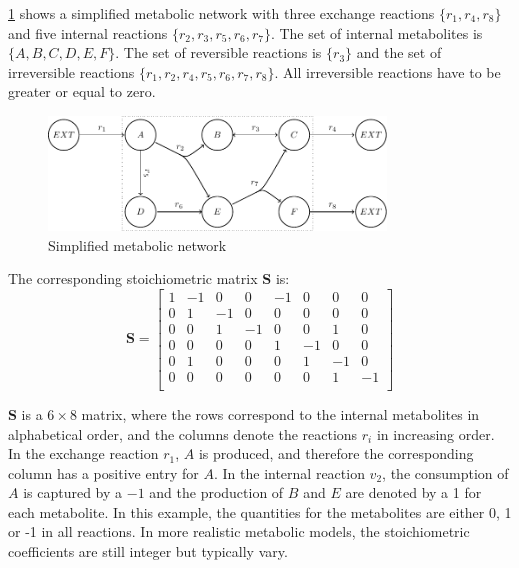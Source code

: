 \cref{fig:simple_model} shows a simplified metabolic network with three exchange reactions $\{r_1, r_4, r_8\}$ and five internal reactions $\{r_2, r_3, r_5, r_6, r_7\}$. The set of internal metabolites is $\{A, B, C, D, E, F\}$. The set of reversible reactions is $\{r_3\}$ and the set of irreversible reactions $\{r_1, r_2, r_4, r_5, r_6, r_7, r_8\}$. All irreversible reactions have to be greater or equal to zero. %

\begin{figure}[h!]
    \centering
    \includegraphics[width=0.8\textwidth]{Images/tikz_graphs_model_with_hyperarcs.pdf}
    \caption{Simplified metabolic network}
    \label{fig:simple_model}
\end{figure}

The corresponding stoichiometric matrix $\mathbf S$ is:
\begin{equation*}
    \mathbf S =
    \left[\begin{array}{cccccccc}
        1 & -1 & 0 & 0 & -1 & 0 & 0 & 0\\
        0 & 1 & -1 & 0 & 0 & 0 & 0 & 0\\
        0 & 0 & 1 & -1 & 0 & 0 & 1 & 0\\
        0 & 0 & 0 & 0 & 1 & -1 & 0 & 0\\
        0 & 1 & 0 & 0 & 0 & 1 & -1 & 0\\
        0 & 0 & 0 & 0 & 0 & 0 & 1 & -1\\    
    \end{array}\right]        
\end{equation*}

$\mathbf S$ is a $6 \times 8$ matrix, where the rows correspond to the internal metabolites in alphabetical order, and the columns denote the reactions $r_i$ in increasing order. In the exchange reaction $r_1$, $A$ is produced, and therefore the corresponding column has a positive entry for $A$. In the internal reaction $v_2$, the consumption of $A$ is captured by a $-1$ and the production of $B$ and $E$ are denoted by a 1 for each metabolite. In this example, the quantities for the metabolites are either 0, 1 or -1 in all reactions. In more realistic metabolic models, the stoichiometric coefficients are still integer but typically vary.

